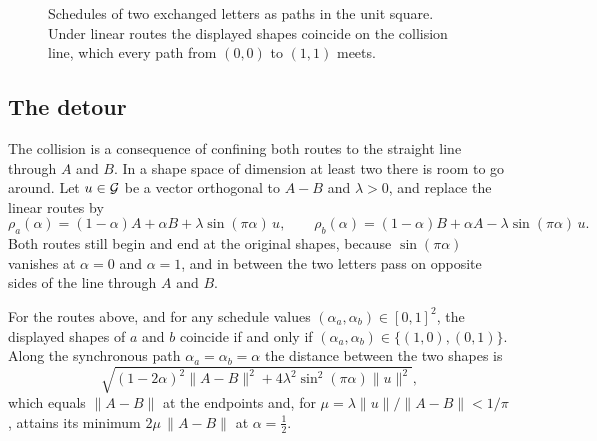 \begin{figure}[ht]
\centering
{}
\caption{Schedules of two exchanged letters as paths in the unit square. Under linear routes the displayed shapes coincide on the collision line, which every path from $(0,0)$ to $(1,1)$ meets.}\label{fig:square}
\end{figure}

\subsection{The detour}

The collision is a consequence of confining both routes to the straight line through $A$ and $B$. In a shape space of dimension at least two there is room to go around. Let $u\in\mathcal{G}$ be a vector orthogonal to $A-B$ and $\lambda>0$, and replace the linear routes by
\[
\rho_a(\alpha)=(1-\alpha)A+\alpha B+\lambda\sin(\pi\alpha)\,u,\qquad
\rho_b(\alpha)=(1-\alpha)B+\alpha A-\lambda\sin(\pi\alpha)\,u .
\]
Both routes still begin and end at the original shapes, because $\sin(\pi\alpha)$ vanishes at $\alpha=0$ and $\alpha=1$, and in between the two letters pass on opposite sides of the line through $A$ and $B$.

\begin{proposition}[Detour]\label{prop:detour}
For the routes above, and for any schedule values $(\alpha_a,\alpha_b)\in[0,1]^2$, the displayed shapes of $a$ and $b$ coincide if and only if $(\alpha_a,\alpha_b)\in\{(1,0),(0,1)\}$. Along the synchronous path $\alpha_a=\alpha_b=\alpha$ the distance between the two shapes is
\[
\sqrt{(1-2\alpha)^2\|A-B\|^2+4\lambda^2\sin^2(\pi\alpha)\|u\|^2},
\]
which equals $\|A-B\|$ at the endpoints and, for $\mu=\lambda\|u\|/\|A-B\|<1/\pi$, attains its minimum $2\mu\,\|A-B\|$ at $\alpha=\tfrac12$.
\end{proposition}

